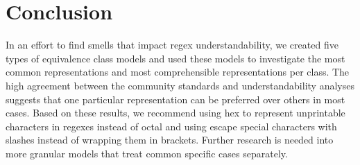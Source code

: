 \section{Conclusion}
\label{sec:conclusion}
In an effort to find smells that impact regex understandability, we created five types of equivalence class models and used these models to investigate the most common representations and most comprehensible representations per class. 
The high agreement between the community standards and understandability analyses suggests that one particular representation can be preferred over others in most cases. 
Based on these results, we recommend using hex to represent unprintable characters in regexes instead of octal and using escape special characters with slashes instead of wrapping them in brackets. Further research is needed into more granular models that treat common specific cases separately. %
